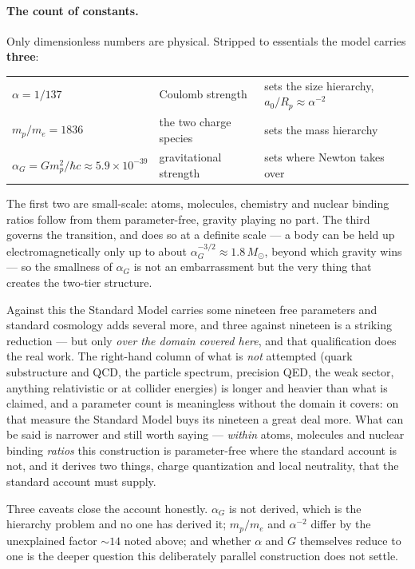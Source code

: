 \documentclass[11pt]{article}
\begin{document}
\paragraph{The count of constants.} Only dimensionless numbers are physical. Stripped to essentials the model
carries \textbf{three}:
\begin{center}
\small
\begin{tabular}{@{}lll@{}}
\toprule
$\alpha=1/137$ & Coulomb strength & sets the size hierarchy, $a_0/R_p\approx\alpha^{-2}$\\
$m_p/m_e=1836$ & the two charge species & sets the mass hierarchy\\
$\alpha_G=Gm_p^2/\hbar c\approx5.9\times10^{-39}$ & gravitational strength & sets where Newton takes over\\
\bottomrule
\end{tabular}
\end{center}
The first two are small-scale: atoms, molecules, chemistry and nuclear binding ratios follow from them
parameter-free, gravity playing no part. The third governs the transition, and does so at a definite scale --- a
body can be held up electromagnetically only up to about $\alpha_G^{-3/2}\approx1.8\,M_\odot$, beyond which
gravity wins --- so the smallness of $\alpha_G$ is not an embarrassment but the very thing that creates the
two-tier structure.

Against this the Standard Model carries some nineteen free parameters and standard cosmology adds several more,
and three against nineteen is a striking reduction --- but only \emph{over the domain covered here}, and that
qualification does the real work. The right-hand column of what is \emph{not} attempted (quark substructure and
QCD, the particle spectrum, precision QED, the weak sector, anything relativistic or at collider energies) is
longer and heavier than what is claimed, and a parameter count is meaningless without the domain it covers: on
that measure the Standard Model buys its nineteen a great deal more. What can be said is narrower and still worth
saying --- \emph{within} atoms, molecules and nuclear binding \emph{ratios} this construction is parameter-free
where the standard account is not, and it derives two things, charge quantization and local neutrality, that the
standard account must supply.

Three caveats close the account honestly. $\alpha_G$ is not derived, which is the hierarchy problem and no one has
derived it; $m_p/m_e$ and $\alpha^{-2}$ differ by the unexplained factor ${\sim}14$ noted above; and whether
$\alpha$ and $G$ themselves reduce to one is the deeper question this deliberately parallel construction does not
settle.
\end{document}
